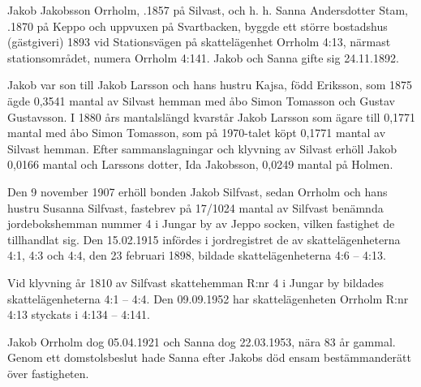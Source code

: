 %
Jakob Jakobsson Orrholm, .1857 på Silvast, och h. h. Sanna Andersdotter Stam, .1870 på Keppo och uppvuxen på Svartbacken, byggde ett större bostadshus (gästgiveri) 1893 vid Stationsvägen på skattelägenhet Orrholm 4:13, närmast stationsområdet, numera Orrholm 4:141. Jakob och Sanna gifte sig 24.11.1892.

Jakob var son till Jakob Larsson och hans hustru Kajsa, född Eriksson, som 1875 ägde 0,3541 mantal av Silvast hemman med åbo Simon Tomasson och Gustav Gustavsson. I 1880 års mantalslängd kvarstår Jakob Larsson som ägare till 0,1771 mantal med åbo Simon Tomasson, som på 1970-talet köpt 0,1771 mantal av Silvast hemman. Efter sammanslagningar och klyvning av Silvast erhöll Jakob 0,0166 mantal och Larssons dotter, Ida Jakobsson, 0,0249 mantal på Holmen.

Den 9 november 1907 erhöll bonden Jakob Silfvast, sedan Orrholm och hans hustru Susanna Silfvast, fastebrev på 17/1024 mantal av Silfvast benämnda jordebokshemman nummer 4 i Jungar by av Jeppo socken, vilken fastighet de tillhandlat sig.
Den 15.02.1915 infördes i jordregistret de av skattelägenheterna 4:1, 4:3 och 4:4, den 23 februari 1898, bildade skattelägenheterna 4:6 – 4:13.

Vid klyvning år 1810 av Silfvast skattehemman R:nr 4 i Jungar by bildades skattelägenheterna 4:1 – 4:4. Den 09.09.1952 har skattelägenheten Orrholm R:nr 4:13 styckats i 4:134 – 4:141.
\begin{jhchildren}
  \item {}
  \item {}
  \item {}
  \item {}
  \item {}
  \item {}
  \item {}
  \item {}
  \item {}
\end{jhchildren}
Jakob Orrholm dog 05.04.1921 och Sanna dog 22.03.1953, nära 83 år gammal. Genom ett domstolsbeslut hade Sanna efter Jakobs död ensam bestämmanderätt över fastigheten.

